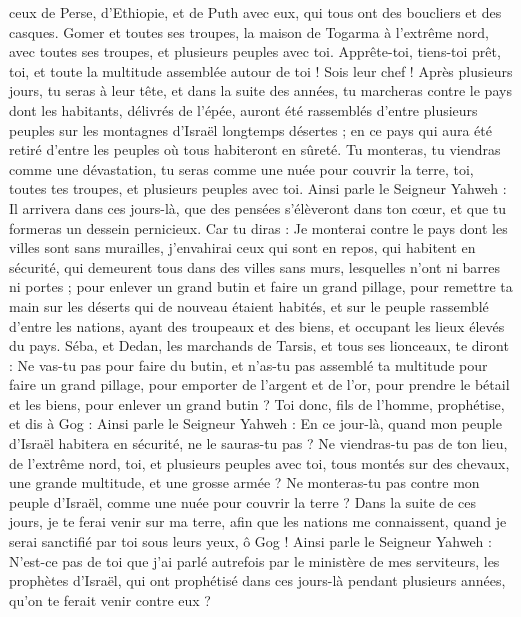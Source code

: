 \begin{multicols}{2}
ceux de Perse, d'Ethiopie, et de Puth avec eux, qui tous ont des boucliers et des casques.
Gomer et toutes ses troupes, la maison de Togarma à l'extrême nord, avec toutes ses troupes, et plusieurs peuples avec toi.
Apprête-toi, tiens-toi prêt, toi, et toute la multitude assemblée autour de toi ! Sois leur chef !
Après plusieurs jours, tu seras à leur tête, et dans la suite des années, tu marcheras contre le pays dont les habitants, délivrés de l'épée, auront été rassemblés d'entre plusieurs peuples sur les montagnes d'Israël longtemps désertes ; en ce pays qui aura été retiré d'entre les peuples où tous habiteront en sûreté.
Tu monteras, tu viendras comme une dévastation, tu seras comme une nuée pour couvrir la terre, toi, toutes tes troupes, et plusieurs peuples avec toi.
Ainsi parle le Seigneur Yahweh : Il arrivera dans ces jours-là, que des pensées s'élèveront dans ton cœur, et que tu formeras un dessein pernicieux.
Car tu diras : Je monterai contre le pays dont les villes sont sans murailles, j'envahirai ceux qui sont en repos, qui habitent en sécurité, qui demeurent tous dans des villes sans murs, lesquelles n'ont ni barres ni portes ;
pour enlever un grand butin et faire un grand pillage, pour remettre ta main sur les déserts qui de nouveau étaient habités, et sur le peuple rassemblé d'entre les nations, ayant des troupeaux et des biens, et occupant les lieux élevés du pays.
Séba, et Dedan, les marchands de Tarsis, et tous ses lionceaux, te diront : Ne vas-tu pas pour faire du butin, et n'as-tu pas assemblé ta multitude pour faire un grand pillage, pour emporter de l'argent et de l'or, pour prendre le bétail et les biens, pour enlever un grand butin ?
Toi donc, fils de l'homme, prophétise, et dis à Gog : Ainsi parle le Seigneur Yahweh : En ce jour-là, quand mon peuple d'Israël habitera en sécurité, ne le sauras-tu pas ?
Ne viendras-tu pas de ton lieu, de l'extrême nord, toi, et plusieurs peuples avec toi, tous montés sur des chevaux, une grande multitude, et une grosse armée ?
Ne monteras-tu pas contre mon peuple d'Israël, comme une nuée pour couvrir la terre ? Dans la suite de ces jours, je te ferai venir sur ma terre, afin que les nations me connaissent, quand je serai sanctifié par toi sous leurs yeux, ô Gog !
Ainsi parle le Seigneur Yahweh : N'est-ce pas de toi que j'ai parlé autrefois par le ministère de mes serviteurs, les prophètes d'Israël, qui ont prophétisé dans ces jours-là pendant plusieurs années, qu'on te ferait venir contre eux ?

\end{multicols}
